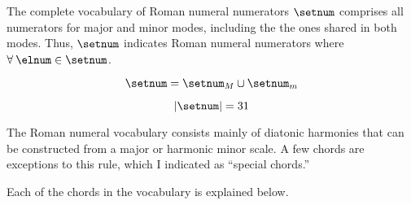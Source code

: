 The complete vocabulary of Roman numeral numerators
$\setnum$ comprises all numerators for major and minor
modes, including the the ones shared in both modes. Thus,
$\setnum$ indicates Roman numeral numerators where $\forall
\: \elnum \in \setnum$.


\begin{equation}
    \setnum = \setnum_{M} \cup \setnum_{m}
\end{equation}

\begin{equation}
    | \setnum | = 31
\end{equation}



The Roman numeral vocabulary consists mainly of diatonic
harmonies that can be constructed from a major or harmonic
minor scale. A few chords are exceptions to this rule, \:
which I indicated as ``special chords.''

Each of the chords in the vocabulary is explained below.


